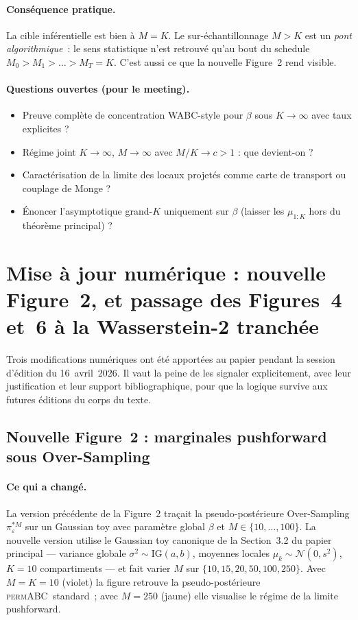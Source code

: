 \documentclass[11pt]{article}
\newcommand{\permABC}{\textsc{permABC}}
\begin{document}
\paragraph{Conséquence pratique.} La cible inférentielle est bien à $M=K$. Le sur-échantillonnage
$M>K$ est un \emph{pont algorithmique}~: le sens statistique n'est retrouvé qu'au bout du schedule
$M_0>M_1>\dots>M_T=K$. C'est aussi ce que la nouvelle Figure~2 rend visible.

\paragraph{Questions ouvertes (pour le meeting).}
\begin{itemize}[nosep]
    \item Preuve complète de concentration WABC-style pour $\beta$ sous $K\to\infty$ avec taux
    explicites ?
    \item Régime joint $K\to\infty$, $M\to\infty$ avec $M/K\to c>1$ : que devient-on ?
    \item Caractérisation de la limite des locaux projetés comme carte de transport ou couplage
    de Monge ?
    \item Énoncer l'asymptotique grand-$K$ uniquement sur $\beta$ (laisser les $\mu_{1:K}$ hors du
    théorème principal) ?
\end{itemize}

\section{Mise à jour numérique : nouvelle Figure~2, et passage des Figures~4 et~6 à la Wasserstein-2 tranchée}
\label{sec:news_fig_and_sw2}

Trois modifications numériques ont été apportées au papier pendant la session d'édition du
16~avril~2026. Il vaut la peine de les signaler explicitement, avec leur justification et
leur support bibliographique, pour que la logique survive aux futures éditions du corps du texte.

\subsection{Nouvelle Figure~2 : marginales pushforward sous Over-Sampling}

\paragraph{Ce qui a changé.} La version précédente de la Figure~2 traçait la pseudo-postérieure
Over-Sampling $\pi_\varepsilon^{*M}$ sur un Gaussian toy avec paramètre global $\beta$ et
$M \in \{10,\dots,100\}$. La nouvelle version utilise le Gaussian toy canonique de la
Section~3.2 du papier principal --- variance globale $\sigma^2 \sim \mathrm{IG}(a,b)$, moyennes
locales $\mu_k \sim \mathcal N(0, s^2)$, $K=10$ compartiments --- et fait varier $M$ sur
$\{10, 15, 20, 50, 100, 250\}$. Avec $M=K=10$ (violet) la figure retrouve la pseudo-postérieure
\permABC\ standard~; avec $M=250$ (jaune) elle visualise le régime de la limite pushforward.
\end{document}
